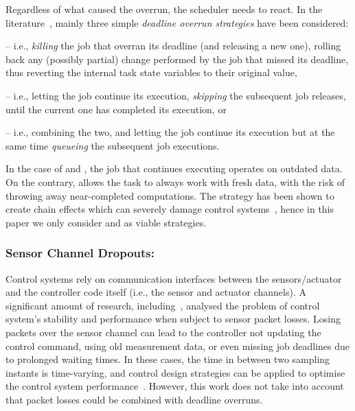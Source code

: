 Regardless of what caused the overrun, the scheduler needs to react.
In the literature~\cite{Cervin:2005}, mainly three simple \emph{deadline overrun strategies} have been considered:
%
\begin{enumerate*}[label=(\roman*)]
    \item \tK{} -- i.e., \emph{killing} the job that overran its deadline (and releasing a new one), rolling back any (possibly partial) change performed by the job that missed its deadline, thus reverting the internal task state variables to their original value,
    \item \tS{} -- i.e., letting the job continue its execution, \emph{skipping} the subsequent job releases, until the current one has completed its execution, or
    \item \tQ{} -- i.e., combining the two, and letting the job continue its execution but at the same time \emph{queueing} the subsequent job executions.
\end{enumerate*}
%
In the case of \tS{} and \tQ{}, the job that continues executing operates on outdated data.
On the contrary, \tK{} allows the task to always work with fresh data, with the risk of throwing away near-completed computations.
The \tQ{} strategy has been shown to create chain effects which can severely damage control systems~\cite{Cervin:2005, Maggio:2020}, hence in this paper we only consider \tK{} and \tS{} as viable strategies.

\subsubsection*{Sensor Channel Dropouts:}
Control systems rely on communication interfaces between the sensors/actuator and the controller code itself (i.e., the sensor and actuator channels).
A significant amount of research, including~\cite{Ling:2002, Linsenmayer:2017, Kauer:2014, Goswami:2014}, analysed the problem of control system's stability and performance when subject to sensor packet losses.
Losing packets over the sensor channel can lead to the controller not updating the control command, using old measurement data, or even missing job deadlines due to prolonged waiting times.
In these cases, the time in between two sampling instants is time-varying, and control design strategies can be applied to optimise the control system performance~\cite{Ghosh:2018, Schinkel:2002}.
However, this work does not take into account that packet losses could be combined with deadline overruns.

